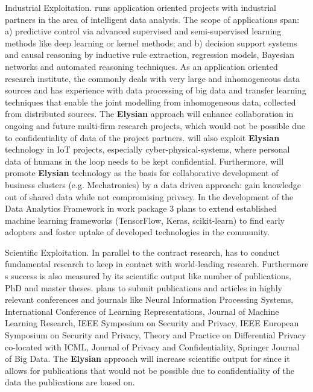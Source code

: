 \documentclass[a4paper,11pt]{article}
\newcommand{\project}[1]{\textbf{#1}\xspace}
\newcommand{\SECURITY}{\project{Elysian}}
\newcommand{\TheProject}{\SECURITY}
\begin{document}
Industrial Exploitation. \SCCHshort{} runs application oriented projects with industrial partners in the area of intelligent data analysis. The scope of applications span: a) predictive control via advanced supervised and semi-supervised learning methods like deep learning or kernel methods; and b) decision support systems and causal reasoning by inductive rule extraction, regression models, Bayesian networks and automated reasoning techniques. As an application oriented research institute, the \SCCHlong{} commonly deals with very large and inhomogeneous data sources and has experience with data processing of big data and transfer learning techniques that enable the joint modelling from inhomogeneous data, collected from distributed sources. The \TheProject{} approach will enhance collaboration in ongoing and future multi-firm research projects, which would not be possible due to confidentiality of data of the project partners. \SCCHshort{} will also exploit \TheProject{} technology in IoT projects, especially cyber-physical-systems, where personal data of humans in the loop needs to be kept confidential. Furthermore, \SCCHshort{} will promote \TheProject{} technology as the basis for collaborative development of business clusters (e.g. Mechatronics) by a data driven approach: gain knowledge out of shared data while not compromising privacy. In the development of the Data Analytics Framework in work package 3 \SCCHshort{} plans to extend established machine learning frameworks (TensorFlow, Keras, scikit-learn) to find early adopters and foster uptake of developed technologies in the community.

Scientific Exploitation. In parallel to the contract research, \SCCHshort{} has to conduct fundamental research to keep in contact with world-leading research. Furthermore \SCCHshort{}s success is also measured by its scientific output like number of publications, PhD and master theses. \SCCHshort{} plans to submit publications and articles in highly relevant conferences and journals like Neural Information Processing Systems, International Conference of Learning Representations, Journal of Machine Learning Research, IEEE Symposium on Security and Privacy, IEEE European Symposium on Security and Privacy, Theory and Practice on Differential Privacy co-located with ICML, Journal of Privacy and Confidentiality, Springer Journal of Big Data. The \TheProject{} approach will increase scientific output for \SCCHshort{} since it allows for publications that would not be possible due to confidentiality of the data the publications are based on.
\end{document}
